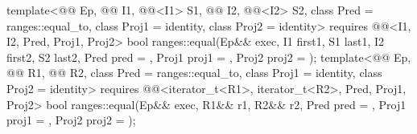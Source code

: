 \begin{itemdecl}
template<@@ Ep, @@ I1, @@<I1> S1,
         @@ I2, @@<I2> S2,
         class Pred = ranges::equal_to, class Proj1 = identity, class Proj2 = identity>
  requires @@<I1, I2, Pred, Proj1, Proj2>
  bool ranges::equal(Ep&& exec, I1 first1, S1 last1, I2 first2, S2 last2,
                     Pred pred = {}, Proj1 proj1 = {}, Proj2 proj2 = {});
template<@@ Ep, @@ R1, @@ R2,
         class Pred = ranges::equal_to, class Proj1 = identity, class Proj2 = identity>
  requires @@<iterator_t<R1>, iterator_t<R2>, Pred, Proj1, Proj2>
  bool ranges::equal(Ep&& exec, R1&& r1, R2&& r2,
                     Pred pred = {}, Proj1 proj1 = {}, Proj2 proj2 = {});
\end{itemdecl}


